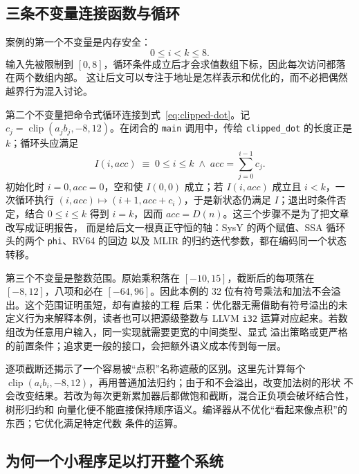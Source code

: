 \subsection{三条不变量连接函数与循环}

案例的第一个不变量是内存安全：
\[
  0\le i<k\le 8.
\]
输入先被限制到 $[0,8]$，循环条件成立后才会求值数组下标，因此每次访问都落在两个数组内部。
这让后文可以专注于地址是怎样表示和优化的，而不必把偶然越界行为混入讨论。

第二个不变量把命令式循环连接到式~\eqref{eq:clipped-dot}。记
\(c_j=\operatorname{clip}(a_jb_j,-8,12)\)。在闭合的 \texttt{main} 调用中，传给
\texttt{clipped\_dot} 的长度正是 $k$；循环头应满足
\begin{equation}
  I(i,acc)\;\equiv\;
  0\le i\le k\;\land\;
  acc=\sum_{j=0}^{i-1}c_j.
  \label{eq:loop-invariant}
\end{equation}
初始化时 $i=0,acc=0$，空和使 $I(0,0)$ 成立；若 $I(i,acc)$ 成立且 $i<k$，一次循环执行
\((i,acc)\mapsto(i+1,acc+c_i)\)，于是新状态仍满足 $I$；退出时条件否定，结合
$0\le i\le k$ 得到 $i=k$，因而 $acc=D(n)$。这三个步骤不是为了把文章改写成证明报告，
而是给后文一根真正守恒的轴：SysY 的两个赋值、SSA 循环头的两个 \texttt{phi}、RV64 的回边
以及 MLIR 的归约迭代参数，都在编码同一个状态转移。

第三个不变量是整数范围。原始乘积落在 $[-10,15]$，截断后的每项落在 $[-8,12]$，八项和必在
$[-64,96]$。因此本例的 32 位有符号乘法和加法不会溢出。这个范围证明虽短，却有直接的工程
后果：优化器无需借助有符号溢出的未定义行为来解释本例，读者也可以把源级整数与 LLVM
\texttt{i32} 运算对应起来。若数组改为任意用户输入，同一实现就需要更宽的中间类型、显式
溢出策略或更严格的前置条件；追求更一般的接口，会把额外语义成本传到每一层。

逐项截断还揭示了一个容易被“点积”名称遮蔽的区别。这里先计算每个
$\operatorname{clip}(a_i b_i,-8,12)$，再用普通加法归约；由于和不会溢出，改变加法树的形状
不会改变结果。若改为每次更新累加器后都做饱和截断，混合正负项会破坏结合性，树形归约和
向量化便不能直接保持顺序语义。编译器从不优化“看起来像点积”的东西；它优化满足特定代数
条件的运算。

\subsection{为何一个小程序足以打开整个系统}

